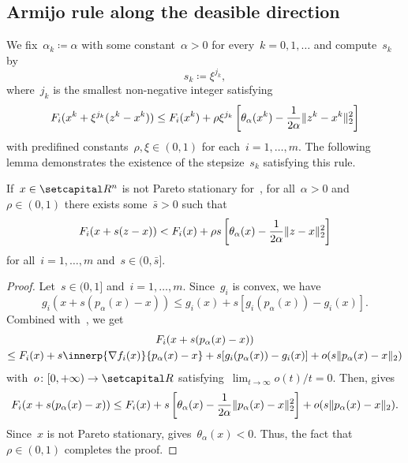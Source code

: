 \documentclass[../main]{subfiles}
\begin{document}
\subsection{Armijo rule along the deasible direction} 
We fix~$\alpha_k \coloneqq \alpha$ with some constant~$\alpha > 0$ for every~$k = 0, 1, \dots$ and compute~$s_k$ by 
\begin{equation} \label{eq:pgm_armijo_step}
    s_k \coloneqq \xi^{j_k}
,\end{equation}
where~$j_k$ is the smallest non-negative integer satisfying
\begin{equation} \label{eq:pgm_armijo_rule}
    F_i(x^k + \xi^{j_k} (z^k - x^k)) \le F_i(x^k) + \rho \xi^{j_k} \left[\theta_\alpha(x^k) - \frac{1}{2 \alpha} \lVert z^k - x^k\rVert_2^2\right]
\end{equation} 
with predifined constants~$\rho, \xi \in (0, 1)$ for each~$i = 1, \dots, m$.
The following lemma demonstrates the existence of the stepsize~$s_k$ satisfying this rule.
\begin{lemma} 
    If~$x \in \setR^n$ is not Pareto stationary for~, for all~$\alpha > 0$ and~$\rho \in (0, 1)$ there exists some~$\bar{s} > 0$ such that
    \begin{equation}
        F_i(x + s (z - x)) < F_i(x) + \rho s \left[\theta_\alpha(x) - \frac{1}{2 \alpha} \lVert z - x\rVert_2^2\right]
    \end{equation} 
    for all~$i = 1, \dots, m$ and~$s \in (0, \bar{s}]$.
\end{lemma}
\begin{proof}
    Let~$s \in (0, 1]$ and~$i = 1, \dots, m$.
    Since~$g_i$ is convex, we have
    \begin{equation}
        g_i(x + s (p_\alpha(x) - x)) \le g_i(x) + s [g_i(p_\alpha(x)) - g_i(x)]
    .\end{equation}
    Combined with~, we get
    \begin{multline}
        F_i(x + s (p_\alpha(x) - x)) \\
        \le F_i(x) + s \innerp{\nabla f_i(x)}{p_\alpha(x) - x} + s [g_i(p_\alpha(x)) - g_i(x)] + o(s \norm{p_\alpha(x) - x}_2)
    \end{multline}
    with~$o \colon [0, + \infty) \to \setR$ satisfying~$\lim_{t \to \infty} o(t) / t = 0$.
    Then,  gives
    \begin{equation}
        F_i(x + s (p_\alpha(x) - x)) 
        \le F_i(x) + s \left[ \theta_\alpha(x) - \frac{1}{2 \alpha} \lVert p_\alpha(x) - x\rVert_2^2 \right] + o(s \lVert p_\alpha(x) - x\rVert_2)
    .\end{equation}
    Since~$x$ is not Pareto stationary,  gives~$\theta_\alpha(x) < 0$.
    Thus, the fact that~$\rho \in (0, 1)$ completes the proof.
\end{proof}
\end{document}
